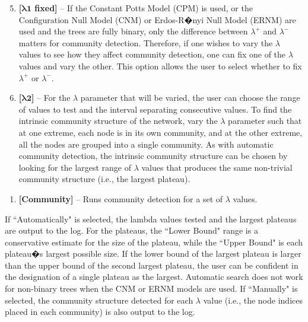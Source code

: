 \documentclass[11pt]{article}
\begin{document}
\begin{enumerate}[{\indent\bf 1-}]
\setcounter{enumi}{4}

\item {\bf [$\mathbf{\lambda1}$ fixed]} -- If the Constant Potts Model (CPM) is used, or the Configuration Null
Model (CNM) or Erdos-R�nyi Null Model (ERNM) are used and the trees are fully
binary, only the difference between $\lambda^{+}$ and $\lambda^{-}$ matters for community detection.
Therefore, if one wishes to vary the $\lambda$ values to see how they affect community
detection, one can fix one of the $\lambda$ values and vary the other. This option allows the
user to select whether to fix $\lambda^{+}$ or $\lambda^{-}$.

\item {\bf [$\mathbf{\lambda2}$]} -- For the $\lambda$ parameter that will be varied, the user can choose the range of values to test and the interval separating consecutive values. To find the intrinsic
community structure of the network, vary the $\lambda$ parameter such that at one extreme,
each node is in its own community, and at the other extreme, all the nodes are
grouped into a single community. As with automatic community detection, the
intrinsic community structure can be chosen by looking for the largest range of $\lambda$
values that produces the same non-trivial community structure (i.e., the largest
plateau).
\end{enumerate}


\begin{enumerate}[{\bf 7-}]
\item {\bf [Community]} -- Runs community detection for a set of $\lambda$ values. \\
\end{enumerate}


If ``Automatically" is selected, the lambda values tested and the largest plateaus are
output to the log. For the plateaus, the ``Lower Bound" range is a conservative estimate for
the size of the plateau, while the ``Upper Bound" is each plateau�s largest possible size. If the
lower bound of the largest plateau is larger than the upper bound of the second largest
plateau, the user can be confident in the designation of a single plateau as the largest.
Automatic search does not work for non-binary trees when the CNM or ERNM models are
used. If ``Manually" is selected, the community structure detected for each $\lambda$ value (i.e., the
node indices placed in each community) is also output to the log. \\
\end{document}
